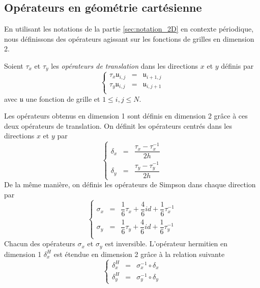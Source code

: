 \subsection{Opérateurs en géométrie cartésienne}

En utilisant les notations de la partie \ref{sec:notation_2D} en contexte périodique, nous définissons des opérateurs agissant sur les fonctions de grilles en dimension 2.

\begin{definition}
Soient $\tau_x$ et $\tau_y$ les \textit{opérateurs de translation} dans les directions $x$ et $y$ définis par
\begin{equation}
\left\lbrace
\begin{array}{rcl}
\tau_x \mathfrak{u}_{i,j} & = & \mathfrak{u}_{i+1,j}\\
\tau_y \mathfrak{u}_{i,j} & = & \mathfrak{u}_{i,j+1}\\
\end{array}
\right.
\end{equation}
avec $\mathfrak{u}$ une fonction de grille et $1 \leq i,j \leq N$.
\end{definition}

Les opérateurs obtenus en dimension 1 sont définis en dimension 2 grâce à ces deux opérateurs de translation. On définit les opérateurs centrés dans les directions $x$ et $y$ par 
\begin{equation}
\left\lbrace
\begin{array}{rcl}
\delta_x & = & \dfrac{\tau_x - \tau_x^{-1}}{2h} \\
\delta_y & = & \dfrac{\tau_y - \tau_y^{-1}}{2h}
\end{array}
\right.
\label{eq:der_centrée_2D}
\end{equation}
De la même manière, on définis les opérateurs de Simpson dans chaque direction par 
\begin{equation}
\left\lbrace
\begin{array}{rcl}
\sigma_x & = & \dfrac{1}{6} \tau_x + \dfrac{4}{6} id + \dfrac{1}{6} \tau_x^{-1} \\
\sigma_y & = & \dfrac{1}{6} \tau_y + \dfrac{4}{6} id + \dfrac{1}{6} \tau_y^{-1} \\
\end{array}
\right.
\label{eq:simpson_2D}
\end{equation}
Chacun des opérateurs $\sigma_x$ et $\sigma_y$ est inversible.
L'opérateur hermitien en dimension 1 $\delta_x^H$ est étendue en dimension 2 grâce à la relation suivante 
\begin{equation}
\left\lbrace
\begin{array}{rcl}
\delta_x^H & = & \sigma_x^{-1} \circ \delta_x \\
\delta_y^H & = & \sigma_y^{-1} \circ \delta_y
\end{array}
\right.
\label{eq:der_herm_2D}
\end{equation}

